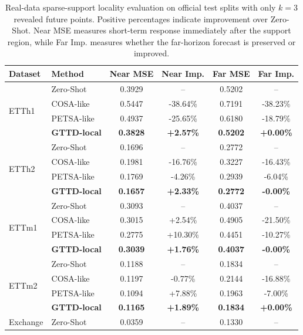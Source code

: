 \documentclass{article}
\begin{document}
\begin{table}[t]
\centering
\caption{Real-data sparse-support locality evaluation on official test splits with only $k{=}3$ revealed future points. Positive percentages indicate improvement over Zero-Shot. Near MSE measures short-term response immediately after the support region, while Far Imp. measures whether the far-horizon forecast is preserved or improved.}
\label{tab:real_small_support_k3_only}
\scriptsize
\setlength{\tabcolsep}{4pt}
\begin{tabular}{llcccc}
\toprule
\textbf{Dataset} & \textbf{Method} & \textbf{Near MSE} & \textbf{Near Imp.} & \textbf{Far MSE} & \textbf{Far Imp.} \\
\midrule
\multirow{4}{*}{ETTh1} & Zero-Shot & 0.3929 & -- & 0.5202 & -- \\
 & COSA-like & 0.5447 & -38.64\% & 0.7191 & -38.23\% \\
 & PETSA-like & 0.4937 & -25.65\% & 0.6180 & -18.79\% \\
 & \textbf{GTTD-local} & \textbf{0.3828} & \textbf{+2.57\%} & \textbf{0.5202} & \textbf{+0.00\%} \\
\midrule
\multirow{4}{*}{ETTh2} & Zero-Shot & 0.1696 & -- & 0.2772 & -- \\
 & COSA-like & 0.1981 & -16.76\% & 0.3227 & -16.43\% \\
 & PETSA-like & 0.1769 & -4.26\% & 0.2939 & -6.04\% \\
 & \textbf{GTTD-local} & \textbf{0.1657} & \textbf{+2.33\%} & \textbf{0.2772} & \textbf{-0.00\%} \\
\midrule
\multirow{4}{*}{ETTm1} & Zero-Shot & 0.3093 & -- & 0.4037 & -- \\
 & COSA-like & 0.3015 & +2.54\% & 0.4905 & -21.50\% \\
 & PETSA-like & 0.2775 & +10.30\% & 0.4451 & -10.27\% \\
 & \textbf{GTTD-local} & \textbf{0.3039} & \textbf{+1.76\%} & \textbf{0.4037} & \textbf{-0.00\%} \\
\midrule
\multirow{4}{*}{ETTm2} & Zero-Shot & 0.1188 & -- & 0.1834 & -- \\
 & COSA-like & 0.1197 & -0.77\% & 0.2144 & -16.88\% \\
 & PETSA-like & 0.1094 & +7.88\% & 0.1963 & -7.00\% \\
 & \textbf{GTTD-local} & \textbf{0.1165} & \textbf{+1.89\%} & \textbf{0.1834} & \textbf{+0.00\%} \\
\midrule
\multirow{4}{*}{Exchange} & Zero-Shot & 0.0359 & -- & 0.1330 & -- \\

\end{tabular}
\end{table}
\end{document}
